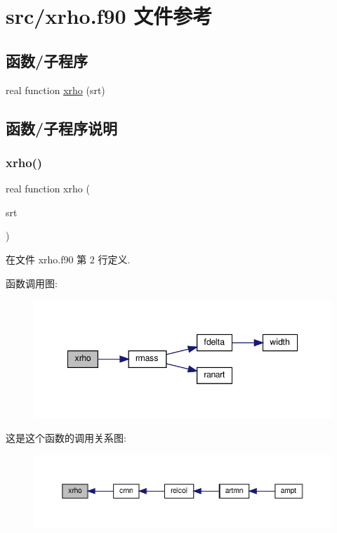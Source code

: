 \hypertarget{xrho_8f90}{}\section{src/xrho.f90 文件参考}
\label{xrho_8f90}
\subsection*{函数/子程序}
\begin{DoxyCompactItemize}
\item 
real function \mbox{\hyperlink{xrho_8f90_ab95740af7bd54f00016022a3365d4e86}{xrho}} (srt)
\end{DoxyCompactItemize}


\subsection{函数/子程序说明}
\mbox{\label{xrho_8f90_ab95740af7bd54f00016022a3365d4e86}} 
\subsubsection{\texorpdfstring{xrho()}{xrho()}}
{\footnotesize\ttfamily real function xrho (\begin{DoxyParamCaption}\item[{}]{srt }\end{DoxyParamCaption})}



在文件 xrho.\+f90 第 2 行定义.

函数调用图\+:
\nopagebreak
\begin{figure}[H]
\begin{center}
\leavevmode
\includegraphics[width=348pt]{xrho_8f90_ab95740af7bd54f00016022a3365d4e86_cgraph}
\end{center}
\end{figure}
这是这个函数的调用关系图\+:
\nopagebreak
\begin{figure}[H]
\begin{center}
\leavevmode
\includegraphics[width=350pt]{xrho_8f90_ab95740af7bd54f00016022a3365d4e86_icgraph}
\end{center}
\end{figure}
